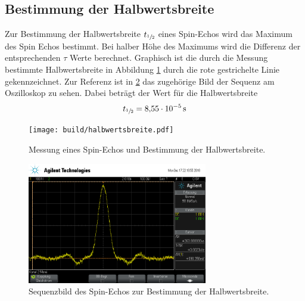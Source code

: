\subsection{Bestimmung der Halbwertsbreite}
Zur Bestimmung der Halbwertsbreite $t_{\sfrac{1}{2}}$ eines Spin-Echos wird das
Maximum des Spin Echos bestimmt. Bei halber Höhe des Maximums wird die Differenz
der entsprechenden $\tau$ Werte berechnet. Graphisch ist die durch die Messung
bestimmte Halbwertsbreite in Abbildung \ref{plt:t12} durch die rote gestrichelte
Linie gekennzeichnet.
Zur Referenz ist in \ref{fig:t12} das zugehörige Bild der Sequenz am Oszilloskop zu sehen.
Dabei beträgt der Wert für die Halbwertsbreite
\begin{align*}
  t_{\sfrac{1}{2}} = \SI{8.55e-5}{\second}
\end{align*}
\begin{figure}[htb]
  \centering
  \texttt{[image: build/halbwertsbreite.pdf]}
  \caption{Messung eines Spin-Echos und Bestimmung der Halbwertsbreite.}
  \label{plt:t12}
\end{figure}
\begin{figure}[htb]
  \centering
  \includegraphics[width=0.7\textwidth]{rohdaten/halbwertsbreite.png}
  \caption{Sequenzbild des Spin-Echos zur Bestimmung der Halbwertsbreite.}
  \label{fig:t12}
\end{figure}
\FloatBarrier

